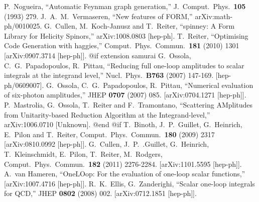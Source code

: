 {{{{{{{\begin{thebibliography}{ABC}
  P.~Nogueira,
  ``Automatic Feynman graph generation,''
  J.\ Comput.\ Phys.\  {\bf 105} (1993) 279.
  J.~A.~M.~Vermaseren,
  ``New features of FORM,''
  arXiv:math-ph/0010025.
  G.~Cullen, M.~Koch-Janusz and T.~Reiter,
  ``spinney: A Form Library for Helicity Spinors,''
  arXiv:1008.0803 [hep-ph].
  T.~Reiter,
  ``Optimising Code Generation with haggies,''
  Comput.\ Phys.\ Commun.\  {\bf 181} (2010) 1301
  [arXiv:0907.3714 [hep-ph]].
@if extension samurai %
  G.~Ossola, C.~G.~Papadopoulos, R.~Pittau,
  ``Reducing full one-loop amplitudes to scalar integrals at the
    integrand level,''
  Nucl.\ Phys.\  {\bf B763 } (2007)  147-169.
  [hep-ph/0609007].
  G.~Ossola, C.~G.~Papadopoulos, R.~Pittau,
  ``Numerical evaluation of six-photon amplitudes,''
  JHEP {\bf 0707 } (2007)  085.
  [arXiv:0704.1271 [hep-ph]].
  P.~Mastrolia, G.~Ossola, T.~Reiter and F.~Tramontano,
  ``Scattering AMplitudes from Unitarity-based Reduction Algorithm at the
    Integrand-level,''
  arXiv:1006.0710 [Unknown].
@end @if %
  T.~Binoth, J.~P.~Guillet, G.~Heinrich, E.~Pilon and T.~Reiter,
  Comput.\ Phys.\ Commun.\  {\bf 180} (2009) 2317
  [arXiv:0810.0992 [hep-ph]].
  G.~Cullen, J.~P.~.Guillet, G.~Heinrich, T.~Kleinschmidt, E.~Pilon, T.~Reiter, M.~Rodgers,
  Comput.\ Phys.\ Commun.\  {\bf 182 } (2011)  2276-2284.
  [arXiv:1101.5595 [hep-ph]].
  A.~van Hameren,
  ``OneLOop: For the evaluation of one-loop scalar functions,''
  [arXiv:1007.4716 [hep-ph]].
  R.~K.~Ellis, G.~Zanderighi,
  ``Scalar one-loop integrals for QCD,''
  JHEP {\bf 0802 } (2008)  002.
  [arXiv:0712.1851 [hep-ph]].

\end{thebibliography}}}}}}}}
